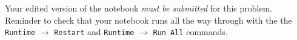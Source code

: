 \documentclass[11pt]{exam}
\begin{document}
\begin{questions}
Your edited version of the notebook \textit{must be submitted } for this problem. Reminder to check that your notebook runs all the way through with the the {\tt Runtime} $\xrightarrow{}$ {\tt Restart} and {\tt Runtime} $\xrightarrow{}$ {\tt Run All} commands.\\


\end{questions}
\end{document}
